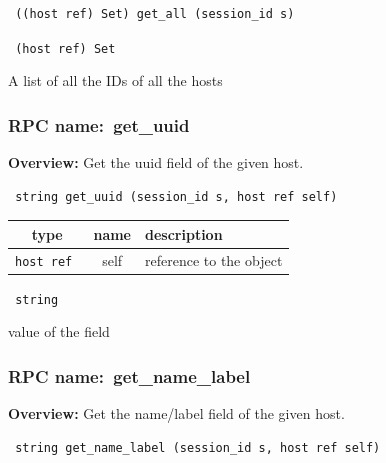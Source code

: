 \begin{verbatim} ((host ref) Set) get_all (session_id s)\end{verbatim}


\vspace{0.3cm}

{\tt 
(host ref) Set
}


A list of all the IDs of all the hosts
\vspace{0.3cm}
\vspace{0.3cm}
\vspace{0.3cm}
\subsubsection{RPC name:~get\_uuid}

{\bf Overview:} 
Get the uuid field of the given host.

\begin{verbatim} string get_uuid (session_id s, host ref self)\end{verbatim}



 
\vspace{0.3cm}
\begin{tabular}{|c|c|p{7cm}|}
 \hline
{\bf type} & {\bf name} & {\bf description} \\ \hline
{\tt host ref } & self & reference to the object \\ \hline 

\end{tabular}

\vspace{0.3cm}

{\tt 
string
}


value of the field
\vspace{0.3cm}
\vspace{0.3cm}
\vspace{0.3cm}
\subsubsection{RPC name:~get\_name\_label}

{\bf Overview:} 
Get the name/label field of the given host.

\begin{verbatim} string get_name_label (session_id s, host ref self)\end{verbatim}


